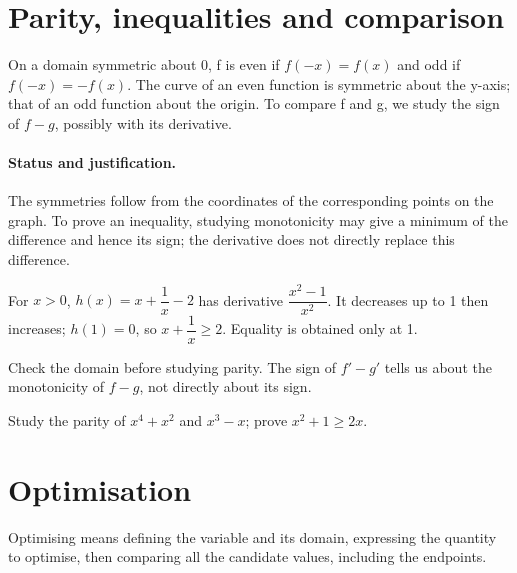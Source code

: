 \section{Parity, inequalities and comparison}\label{C06-U4}
\begin{keypoint}
On a domain symmetric about 0, f is even if $f(-x)=f(x)$ and odd if $f(-x)=-f(x)$. The curve of an even function is symmetric about the y-axis; that of an odd function about the origin. To compare f and g, we study the sign of $f-g$, possibly with its derivative.
\end{keypoint}
\paragraph{Status and justification.} The symmetries follow from the coordinates of the corresponding points on the graph. To prove an inequality, studying monotonicity may give a minimum of the difference and hence its sign; the derivative does not directly replace this difference.
\begin{example}For $x>0$, $h(x)=x+\dfrac{1}{x}-2$ has derivative $\dfrac{x^2-1}{x^2}$. It decreases up to 1 then increases; $h(1)=0$, so $x+\dfrac{1}{x}\geq 2$. Equality is obtained only at 1.\end{example}\label{C06-EX4}
\begin{pitfall}Check the domain before studying parity. The sign of $f\prime-g\prime$ tells us about the monotonicity of $f-g$, not directly about its sign.\end{pitfall}
\begin{application}Study the parity of $x^4+x^2$ and $x^3-x$; prove $x^2+1\geq2x$.\end{application}\label{C06-AP4}
\section{Optimisation}\label{C06-U5}
\begin{keypoint}
Optimising means defining the variable and its domain, expressing the quantity to optimise, then comparing all the candidate values, including the endpoints.
\end{keypoint}
